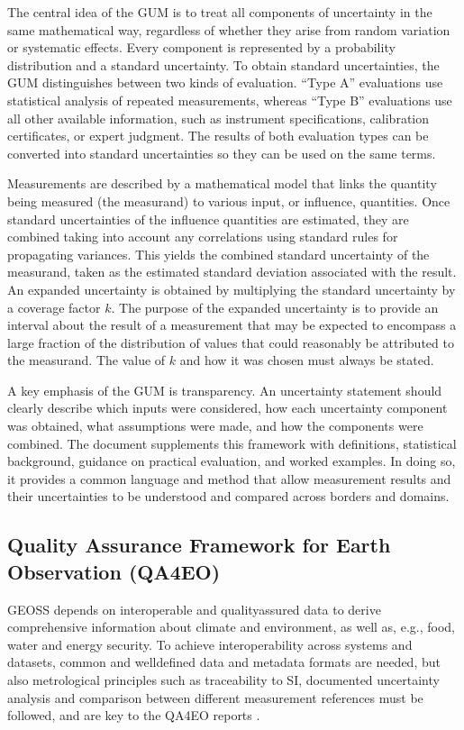 \documentclass[a4paper,10pt,english]{sphinxmanual}
\begin{document}
\sphinxAtStartPar
The central idea of the GUM is to treat all components of uncertainty in the same mathematical way, regardless of whether they arise from random variation or systematic effects. Every component is represented by a probability distribution and a standard uncertainty. To obtain standard uncertainties, the GUM distinguishes between two kinds of evaluation. “Type A” evaluations use statistical analysis of repeated measurements, whereas “Type B” evaluations use all other available information, such as instrument specifications, calibration certificates, or expert judgment. The results of both evaluation types can be converted into standard uncertainties so they can be used on the same terms.

\sphinxAtStartPar
Measurements are described by a mathematical model that links the quantity being measured (the measurand) to various input, or influence, quantities. Once standard uncertainties of the influence quantities are estimated, they are combined \textendash{} taking into account any correlations \textendash{} using standard rules for propagating variances. This yields the combined standard uncertainty of the measurand, taken as the estimated standard deviation associated with the result. An expanded uncertainty is obtained by multiplying the standard uncertainty by a coverage factor \(k\). The purpose of the expanded uncertainty is to provide an interval about the result of a measurement that may be expected to encompass a large fraction of the distribution of values that could reasonably be attributed to the measurand. The value of \(k\) and how it was chosen must always be stated.

\sphinxAtStartPar
A key emphasis of the GUM is transparency. An uncertainty statement should clearly describe which inputs were considered, how each uncertainty component was obtained, what assumptions were made, and how the components were combined. The document supplements this framework with definitions, statistical background, guidance on practical evaluation, and worked examples. In doing so, it provides a common language and method that allow measurement results and their uncertainties to be understood and compared across borders and domains.


\subsection{Quality Assurance Framework for Earth Observation (QA4EO)}
\label{\detokenize{04_uncertainty_analysis:quality-assurance-framework-for-earth-observation-qa4eo}}
\sphinxAtStartPar
GEOSS depends on interoperable and quality\sphinxhyphen{}assured data to derive comprehensive information about climate and environment, as well as, e.g., food, water and energy security. To achieve interoperability across systems and datasets, common and well\sphinxhyphen{}defined data and metadata formats are needed, but also metrological principles such as traceability to SI, documented uncertainty analysis and comparison between different measurement references must be followed, and are key to the QA4EO reports {\hyperref[\detokenize{04_uncertainty_analysis:ref-qa4eo1}]{}}.
\end{document}
